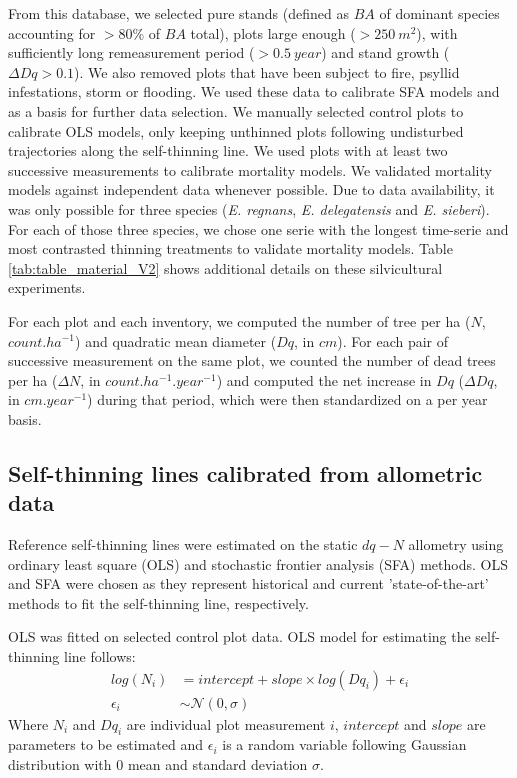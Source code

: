 \documentclass[12pt,english]{article}
\begin{document}
From this database, we selected pure stands (defined as $BA$ of dominant species accounting for $>80\%$ of $BA$ total), plots large enough ($>250 ~m^2$), with sufficiently long remeasurement period ($>0.5 ~year$) and stand growth ($\Delta Dq>0.1$). We also removed plots that have been subject to fire, psyllid infestations, storm or flooding. We used these data to calibrate SFA models and as a basis for further data selection. We manually selected control plots to calibrate OLS models, only keeping unthinned plots following undisturbed trajectories along the self-thinning line. We used plots with at least two successive measurements to calibrate mortality models. We validated mortality models against independent data whenever possible. Due to data availability, it was only possible for three species (\textit{E. regnans}, \textit{E. delegatensis} and \textit{E. sieberi}). For each of those three species, we chose one serie with the longest time-serie and most contrasted thinning treatments to validate mortality models. Table \ref{tab:table_material_V2} shows additional details on these silvicultural experiments.
	
For each plot and each inventory, we computed the number of tree per ha ($N$, $count.ha^{-1}$) and quadratic mean diameter ($Dq$, in $cm$). For each pair of successive measurement on the same plot, we counted the number of dead trees per ha ($\Delta N$, in $count.ha^{-1}.year^{-1}$) and computed the net increase in $Dq$ ($\Delta Dq$, in $cm.year^{-1}$) during that period, which were then standardized on a per year basis.

\subsection{Self-thinning lines calibrated from allometric data}
Reference self-thinning lines were estimated on the static $dq-N$ allometry using ordinary least square (OLS) and stochastic frontier analysis (SFA) methods. OLS and SFA were chosen as they represent historical and current 'state-of-the-art'\citep*{ZhangBiGoveEtAl2005,BiWanTurvey2000} methods to fit the self-thinning line, respectively.

OLS was fitted on selected control plot data. OLS model for estimating the self-thinning line follows:
\begin{align}
  \label{eq:ols}
  log(N_i) &= intercept + slope \times log(Dq_i) + \epsilon_i \\
  \epsilon_i &\sim \mathcal{N} (0, \sigma) \nonumber
\end{align}
Where $N_i$ and $Dq_i$ are individual plot measurement $i$, $intercept$ and $slope$ are parameters to be estimated and $\epsilon_i$ is a random variable following Gaussian distribution with 0 mean and standard deviation $\sigma$.
\end{document}

